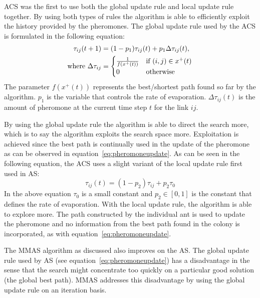 \gls{ACS} was the first to use both the global update rule and local update rule together\cite{CompuIntelligenceIntro}. By using both types of rules the algorithm is able to efficiently exploit the history provided by the pheromones\cite{CompuIntelligenceIntro}. The global update rule used by the \gls{ACS} is formulated in the following equation\cite{CompuIntelligenceIntro}:
\begin{align}
\label{eq:pheromoneupdate}
	\tau_{ij}(t + 1) &= (1 - p_1)\tau_{ij}(t) + p_1\Delta\tau_{ij}(t),\\
	\text{where }\Delta\tau_{ij} &= \notag
	\begin{cases}
		\frac{1}{f(x^+(t))} &\text{if $(i,j) \in x^+(t)$}\\
		0 &\text{otherwise}
	\end{cases}
\end{align}
The parameter $f(x^+(t))$ represents the best/shortest path found so far by the algorithm\cite{CompuIntelligenceIntro}. $p_1$ is the variable that controls the rate of evaporation. $\Delta\tau_{ij}(t)$ is the amount of pheromone at the current time step $t$ for the link $ij$.

By using the global update rule the algorithm is able to direct the search more, which is to say the algorithm exploits the search space more. Exploitation is achieved since the best path is continually used in the update of the pheromone as can be observed in equation~\ref{eq:pheromoneupdate}\cite{CompuIntelligenceIntro,FundamentalSwarm}.
As can be seen in the following equation, the \gls{ACS} uses a slight variant of the local update rule first used in \gls{AS}\cite{CompuIntelligenceIntro}:
\begin{equation}
	\tau_{ij}(t) = (1 - p_2)\tau_{ij} + p_2\tau_0
\end{equation}
In the above equation $\tau_0$ is a small constant and $p_2 \in [0,1]$ is the constant that defines the rate of evaporation\cite{CompuIntelligenceIntro}. With the local update rule, the algorithm is able to explore more. The path constructed by the individual ant is used to update the pheromone and no information from the best path found in the colony is incorporated, as with equation~\ref{eq:pheromoneupdate}\cite{CompuIntelligenceIntro,FundamentalSwarm}.

The \gls{MMAS} algorithm as discussed also improves on the \gls{AS}. The global update rule used by \gls{AS} (see equation~\ref{eq:pheromoneupdate}) has a disadvantage in the sense that the search might concentrate too quickly on a particular good solution (the global best path)\cite{FundamentalSwarm}. \gls{MMAS} addresses this disadvantage by using the global update rule on an iteration basis\cite{FundamentalSwarm}.

